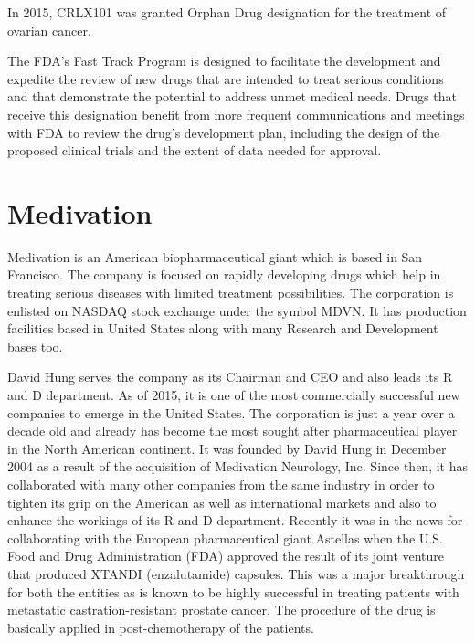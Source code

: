 \documentclass[letterpaper,12pt,english]{sphinxmanual}
\begin{document}
In 2015, CRLX101 was granted Orphan Drug designation for the treatment of ovarian cancer.

The FDA’s Fast Track Program is designed to facilitate the development and expedite the review of new drugs that are intended to treat serious conditions and that demonstrate the potential to address unmet medical needs. Drugs that receive this designation benefit from more frequent communications and meetings with FDA to review the drug’s development plan, including the design of the proposed clinical trials and the extent of data needed for approval.


\chapter{Medivation}
\label{chapters/chapter6:medivation}\label{chapters/chapter6::doc}\label{chapters/chapter6:id1}
Medivation is an American biopharmaceutical giant which is based in San Francisco.
The company is focused on rapidly developing drugs which help in treating serious diseases with limited treatment possibilities.
The corporation is enlisted on NASDAQ stock exchange under the symbol MDVN.
It has production facilities based in United States along with many Research and Development bases too.

David Hung serves the company as its Chairman and CEO and also leads its R and D department.
As of 2015, it is one of the most commercially successful new companies to emerge in the United States.
The corporation is just a year over a decade old and already has become the most sought after pharmaceutical player in the North American continent. It was founded by David Hung in December 2004 as a result of the acquisition of Medivation Neurology, Inc. Since then, it has collaborated with many other companies from the same industry in order to tighten its grip on the American as well as international markets and also to enhance the workings of its R and D department. Recently it was in the news for collaborating with the European pharmaceutical giant Astellas when the U.S. Food and Drug Administration (FDA) approved the result of its joint venture that produced XTANDI (enzalutamide) capsules. This was a major breakthrough for both the entities as is known to be highly successful in treating patients with metastatic castration-resistant prostate cancer. The procedure of the drug is basically applied in post-chemotherapy of the patients.
\end{document}
